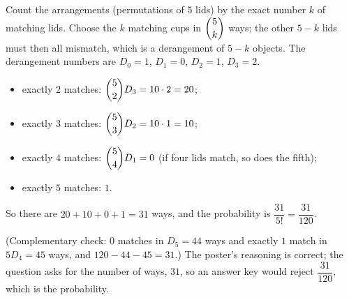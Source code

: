 Count the arrangements (permutations of $5$ lids) by the exact number $k$ of matching lids. Choose the $k$ matching cups in $\dbinom5k$ ways; the other $5-k$ lids must then all mismatch, which is a derangement of $5-k$ objects. The derangement numbers are $D_0=1$, $D_1=0$, $D_2=1$, $D_3=2$.
\begin{itemize}
\item exactly $2$ matches: $\dbinom52D_3=10\cdot2=20$;
\item exactly $3$ matches: $\dbinom53D_2=10\cdot1=10$;
\item exactly $4$ matches: $\dbinom54D_1=0$ (if four lids match, so does the fifth);
\item exactly $5$ matches: $1$.
\end{itemize}
So there are $20+10+0+1=\boxed{31}$ ways, and the probability is $\dfrac{31}{5!}=\dfrac{31}{120}$.

(Complementary check: $0$ matches in $D_5=44$ ways and exactly $1$ match in $5D_4=45$ ways, and $120-44-45=31$.) The poster's reasoning is correct; the question asks for the number of ways, $31$, so an answer key would reject $\dfrac{31}{120}$, which is the probability.
